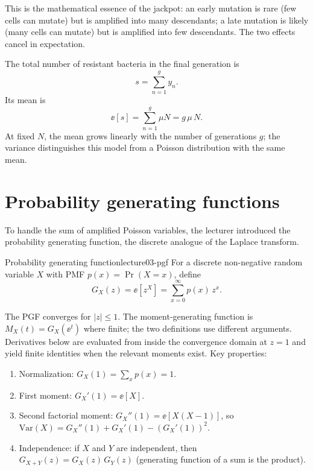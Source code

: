 This is the mathematical essence of the jackpot: an early mutation is rare (few cells can mutate) but is amplified into many descendants; a late mutation is likely (many cells can mutate) but is amplified into few descendants. The two effects cancel in expectation.

The total number of resistant bacteria in the final generation is
\begin{equation}\label{eq:lecture03-s-def}
s = \sum_{n=1}^{g} y_n .
\end{equation}
Its mean is
\begin{equation}\label{eq:lecture03-s-mean}
\ee[s] = \sum_{n=1}^{g} \mu N = g\,\mu\,N .
\end{equation}
At fixed $N$, the mean grows linearly with the number of generations $g$; the variance distinguishes this model from a Poisson distribution with the same mean.

\section{Probability generating functions}\label{sec:lecture03-mgf}

To handle the sum of amplified Poisson variables, the lecturer introduced the probability generating function, the discrete analogue of the Laplace transform.

\begin{definition}{Probability generating function}{lecture03-pgf}
For a discrete non-negative random variable $X$ with PMF $p(x)=\Pr(X=x)$, define
\begin{equation}\label{eq:lecture03-pgf-def}
G_X(z) = \ee[z^{X}] = \sum_{x=0}^{\infty} p(x)\,z^{x}.
\end{equation}
\end{definition}

The PGF converges for $|z|\leq1$. The moment-generating function is $M_X(t)=G_X(\ee^t)$ where finite; the two definitions use different arguments. Derivatives below are evaluated from inside the convergence domain at $z=1$ and yield finite identities when the relevant moments exist. Key properties:
\begin{enumerate}[nosep]
\item Normalization: $G_X(1) = \sum_x p(x) = 1$.
\item First moment: $G_X'(1) = \ee[X]$.
\item Second factorial moment: $G_X''(1) = \ee[X(X-1)]$, so $\mathrm{Var}(X) = G_X''(1) + G_X'(1) - (G_X'(1))^{2}$.
\item Independence: if $X$ and $Y$ are independent, then $G_{X+Y}(z) = G_X(z)\,G_Y(z)$ (generating function of a sum is the product).
\end{enumerate}

